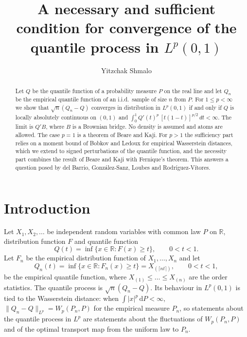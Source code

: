 \documentclass[11pt]{amsart}
\newcommand{\AUTHORNAME}{Yitzchak Shmalo}
\newcommand{\AFFILIATION}{Einstein Institute of Mathematics, The Hebrew University of Jerusalem, Jerusalem, Israel}
\theoremstyle{remark}
\newcommand{\R}{\mathbb{R}}
\newcommand{\dd}{\,\mathrm{d}}
\begin{document}
\title[The quantile process in $L^p$]{A necessary and sufficient condition for convergence of the quantile process in $L^p(0,1)$}

\author{\AUTHORNAME}
\address{\AFFILIATION}


\begin{abstract}
Let $Q$ be the quantile function of a probability measure $P$ on the real line and let $Q_n$ be the empirical quantile function of an i.i.d.\ sample of size $n$ from $P$. For $1\le p<\infty$ we show that $\sqrt n(Q_n-Q)$ converges in distribution in $L^p(0,1)$ if and only if $Q$ is locally absolutely continuous on $(0,1)$ and $\int_0^1 Q'(t)^p\,[t(1-t)]^{p/2}\,dt<\infty$. The limit is $Q'B$, where $B$ is a Brownian bridge. No density is assumed and atoms are allowed. The case $p=1$ is a theorem of Beare and Kaji. For $p>1$ the sufficiency part relies on a moment bound of Bobkov and Ledoux for empirical Wasserstein distances, which we extend to signed perturbations of the quantile function, and the necessity part combines the result of Beare and Kaji with Fernique's theorem. This answers a question posed by del Barrio, Gonz\'alez-Sanz, Loubes and Rodr\'iguez-V\'itores.
\end{abstract}

\maketitle

\section{Introduction}\label{sec:intro}

Let $X_1,X_2,\dots$ be independent random variables with common law $P$ on $\R$, distribution function $F$ and quantile function
\[
Q(t)=\inf\{x\in\R: F(x)\ge t\},\qquad 0<t<1.
\]
Let $F_n$ be the empirical distribution function of $X_1,\dots,X_n$ and let
\[
Q_n(t)=\inf\{x\in\R:F_n(x)\ge t\}=X_{(\lceil nt\rceil)},\qquad 0<t<1,
\]
be the empirical quantile function, where $X_{(1)}\le\dots\le X_{(n)}$ are the order statistics. The quantile process is $\sqrt n(Q_n-Q)$. Its behaviour in $L^p(0,1)$ is tied to the Wasserstein distance: when $\int|x|^p\dd P<\infty$, $\|Q_n-Q\|_{L^p}=W_p(P_n,P)$ for the empirical measure $P_n$, so statements about the quantile process in $L^p$ are statements about the fluctuations of $W_p(P_n,P)$ and of the optimal transport map from the uniform law to $P_n$.
\end{document}
